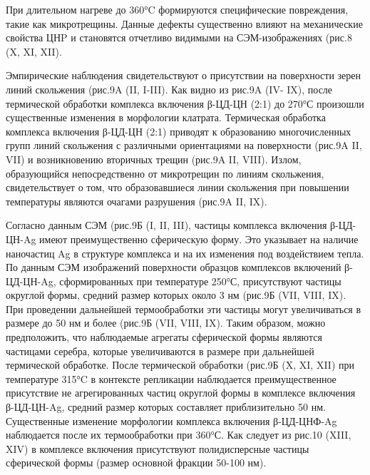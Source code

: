 \begin{multicols}{2}
При длительном нагреве до 360°C формируются специфические повреждения,
такие как микротрещины. Данные дефекты существенно влияют на
механические свойства ЦНP и становятся отчетливо видимыми на
СЭМ-изображениях (рис.8 (X, XI, XII).

Эмпирические наблюдения свидетельствуют о присутствии на поверхности
зерен линий скольжения (рис.9A (II, I-III). Как видно из рис.9A (IV-
IX), после термической обработки комплекса включения β-ЦД-ЦН (2:1) до
270°С произошли существенные изменения в морфологии клатрата.
Термическая обработка комплекса включения β-ЦД-ЦН (2:1) приводят к
образованию многочисленных групп линий скольжения с различными
ориентациями на поверхности (рис.9A II, VII) и возникновению вторичных
трещин (рис.9A II, VIII). Излом, образующийся непосредственно от
микротрещин по линиям скольжения, свидетельствует о том, что
образовавшиеся линии скольжения при повышении температуры являются
очагами разрушения (рис.9A II, IX).

Согласно данным СЭМ (рис.9Б (I, II, III), частицы комплекса включения
β-ЦД-ЦН-Ag имеют преимущественно сферическую форму. Это указывает на
наличие наночастиц Ag в структуре комплекса и на их изменения под
воздействием тепла. По данным СЭМ изображений поверхности образцов
комплексов включений β-ЦД-ЦН-Ag, сформированных при температуре 250°С,
присутствуют частицы округлой формы, средний размер которых около 3 нм
(рис.9Б (VII, VIII, IX). При проведении дальнейшей термообработки эти
частицы могут увеличиваться в размере до 50 нм и более (рис.9Б (VII,
VIII, IX). Таким образом, можно предположить, что наблюдаемые агрегаты
сферической формы являются частицами серебра, которые увеличиваются в
размере при дальнейшей термической обработке. После термической
обработки (рис.9Б (X, XI, XII) при температуре 315°C в контексте
репликации наблюдается преимущественное присутствие не агрегированных
частиц округлой формы в комплексе включения β-ЦД-ЦН-Ag, средний размер
которых составляет приблизительно 50 нм. Существенные изменение
морфологии комплекса включения β-ЦД-ЦНФ-Ag наблюдается после их
термообработки при 360°С. Как следует из рис.10 (XIII, XIV) в комплексе
включения присутствуют полидисперсные частицы сферической формы (размер
основной фракции 50-100 нм).
\end{multicols}

\hfill
{}
\figend

